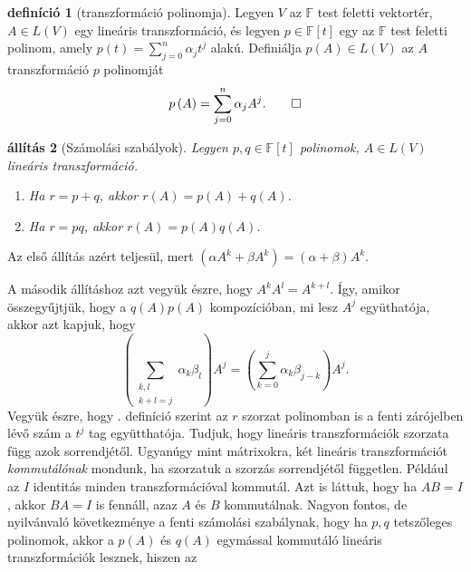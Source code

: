 \documentclass[a4paper, showtrims]{memoir}
\makeatletter
\renewenvironment{proof}[1][\proofname]
    {\par\pushQED{\qed}%
    \normalfont \topsep6\p@\@plus6\p@\relax
    \trivlist
    \item[\hskip\labelsep
        \itshape
    #1\@addpunct{:}]\ignorespaces}
    {\popQED\endtrivlist\@endpefalse}
\theoremstyle{plain}
\newtheorem{proposition}{állítás}[chapter]
\theoremstyle{remark}
\theoremstyle{definition}
\newtheorem{definition}[proposition]{definíció}
\makeatother
\begin{document}
\begin{definition}[transzformáció polinomja]
	Legyen $V$ az $\mathbb{F}$ test feletti vektortér,
	$A\in L\left( V \right)$ egy lineáris transzformáció, és
	legyen $p\in\mathbb{F}\left[t \right]$ egy az $\mathbb{F}$ test feletti
	polinom,
	amely $p\left( t \right)=
		\sum_{j=0}^n\alpha_jt^j$
	alakú.
	Definiálja $p\left( A \right)\in L\left( V \right)$
	az $A$ transzformáció $p$ polinomját
	\[
		p\left( A \right)
		=
		\sum_{j=0}^n\alpha_jA^j.\qedhere
	\]
\end{definition}
\begin{proposition}[Számolási szabályok]
	Legyen $p,q\in\mathbb{F}\left[ t \right]$ polinomok,
	$A\in L\left( V \right)$ lineáris transzformáció.
	\begin{enumerate}
		\item Ha $r=p+q$, akkor $r\left( A \right)=p\left( A \right)+q\left( A \right)$.
		\item Ha $r=pq$, akkor $r\left( A \right)=p\left( A \right)q\left( A \right)$.\qedhere
	\end{enumerate}
\end{proposition}
\begin{proof}
	Az első állítás azért teljesül, mert
	\(
	\left( \alpha A^k+\beta A^k \right)
	=
	\left( \alpha+\beta \right)A^k.
	\)

	A második állításhoz azt vegyük észre, hogy
	\(
	A^kA^l=A^{k+l}.
	\)
	Így, amikor összegyűjtjük, hogy a $q\left( A \right)p\left( A \right)$
	kompozícióban, mi lesz $A^j$ együthatója,
	akkor azt kapjuk,
	hogy
	\begin{displaymath}
		\left( \sum_{\substack{k,l\\k+l=j}}\alpha_k\beta_l \right)A^j
		=
		\left( \sum_{k=0}^j\alpha_k\beta_{j-k} \right)A^j.
	\end{displaymath}
    Vegyük észre, hogy . definíció szerint az
	$r$ szorzat polinomban is a fenti zárójelben lévő szám a
	$t^j$ tag együtthatója.
\end{proof}
Tudjuk, hogy lineáris transzformációk szorzata függ azok sorrendjétől.
Ugyanúgy mint mátrixokra, két lineáris transzformációt \emph{kommutálónak}
mondunk, ha szorzatuk a szorzás sorrendjétől független.
Például az $I$ identitás minden transzformációval kommutál.
Azt is láttuk, hogy ha $AB=I$, akkor $BA=I$ is fennáll, azaz $A$ és $B$ kommutálnak.
Nagyon fontos, de nyilvánvaló következménye a fenti számolási szabálynak,
hogy ha $p,q$ tetszőleges polinomok, akkor a $p\left( A \right)$ és $q\left( A \right)$ egymással kommutáló lineáris transzformációk lesznek, hiszen az
\end{document}
